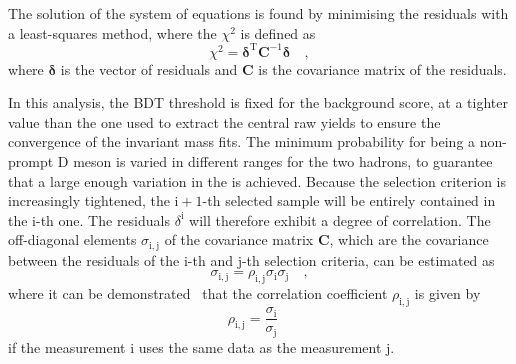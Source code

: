 The solution of the system of equations is found by minimising the residuals with a least-squares method, where the $\chi^2$ is defined as 
\begin{equation*}
    \chi^2 = \pmb{\delta}^\mathrm{T}\mathbf{C}^{-1}\pmb{\delta}\quad ,
\end{equation*}
where $\pmb{\delta}$ is the vector of residuals and $\mathbf{C}$ is the covariance matrix of the residuals.

In this analysis, the BDT threshold is fixed for the background score, at a tighter value than the one used to extract the central raw yields to ensure the convergence of the invariant mass fits. The minimum probability for being a non-prompt D meson is varied in different ranges for the two hadrons, to guarantee that a large enough variation in the \fnp is achieved. Because the selection criterion is increasingly tightened, the $\mathrm{i+1}$-th selected sample will be entirely contained in the $\mathrm{i}$-th one. The residuals $\delta^\mathrm{i}$ will therefore exhibit a degree of correlation. The off-diagonal elements $\sigma_\mathrm{i,j}$ of the covariance matrix $\mathbf{C}$, which are the covariance between the residuals of the i-th and j-th selection criteria, can be estimated as 
\begin{equation*}
    \sigma_\mathrm{i,j} = \rho_\mathrm{i,j}\sigma_\mathrm{i}\sigma_\mathrm{j}\quad ,
\end{equation*}
where it can be demonstrated~\cite{cowan1998statistical} that the correlation coefficient $\rho_\mathrm{i,j}$ is given by 
\begin{equation*}
    \rho_\mathrm{i,j} = \frac{\sigma_\mathrm{i}}{\sigma_\mathrm{j}}\quad 
\end{equation*}
if the measurement i uses the same data as the measurement j. 
